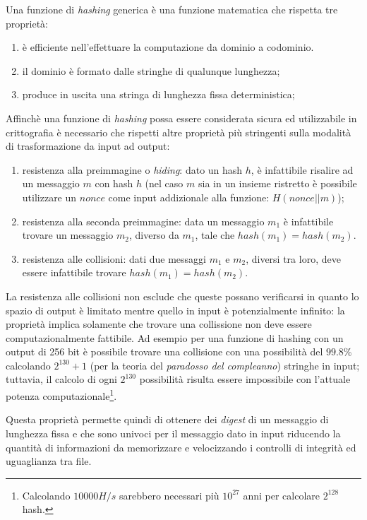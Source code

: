 Una funzione di \textit{hashing} generica è una funzione matematica che rispetta tre proprietà:

\begin{enumerate}
    \item è efficiente nell'effettuare la computazione da dominio a codominio.
    \item il dominio è formato dalle stringhe di qualunque lunghezza;
    \item produce in uscita una stringa di lunghezza fissa deterministica;
\end{enumerate}

Affinchè una funzione di \textit{hashing} possa essere considerata sicura ed utilizzabile in crittografia è necessario che rispetti altre proprietà più stringenti sulla modalità di trasformazione da input ad output:

\begin{enumerate}
    \item resistenza alla preimmagine o \textit{hiding}: dato un hash $h$, è infattibile risalire ad un messaggio $m$ con hash $h$ (nel caso $m$ sia in un insieme ristretto è possibile utilizzare un $nonce$ come input addizionale alla funzione: $H(nonce || m)$);
    \item resistenza alla seconda preimmagine: data un messaggio $m_1$ è infattibile trovare un messaggio $m_2$, diverso da $m_1$, tale che $hash(m_1)=hash(m_2)$.
    \item resistenza alle collisioni: dati due messaggi $m_1$ e $m_2$, diversi tra loro, deve essere infattibile trovare $hash(m_1)=hash(m_2)$.
\end{enumerate}
La resistenza alle collisioni non esclude che queste possano verificarsi in quanto lo spazio di output è limitato mentre quello in input è potenzialmente infinito: la proprietà implica solamente che trovare una collissione non deve essere computazionalmente fattibile. Ad esempio per una funzione di hashing con un output di 256 bit è possibile trovare una collisione con una possibilità del $99.8\%$ calcolando $2^{130}+1$ (per la teoria del \textit{paradosso del compleanno}) stringhe in input; tuttavia, il calcolo di ogni $2^{130}$ possibilità risulta essere impossibile con l'attuale potenza computazionale\footnote{Calcolando $10 000 H/s$ sarebbero necessari più $10^{27}$ anni per calcolare $2^{128}$ hash.}.

Questa proprietà permette quindi di ottenere dei \textit{digest} di un messaggio di lunghezza fissa e che sono univoci per il messaggio dato in input riducendo la quantità di informazioni da memorizzare e velocizzando i controlli di integrità ed uguaglianza tra file.

